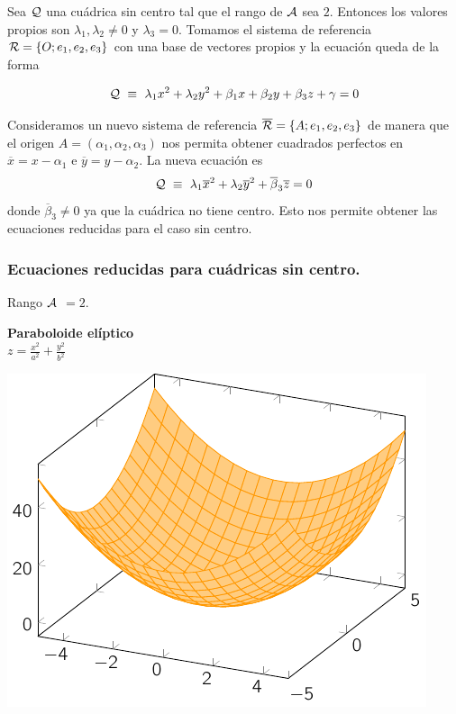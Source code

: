 \documentclass[11pt, a4paper]{article}
\newif\IfInSansMode
\theoremstyle{theorem-style}
\theoremstyle{definition-style}
\theoremstyle{remark-style}
\theoremstyle{example-style}
\begin{document}
Sea $\cal Q$ una cu\'adrica sin centro tal que el rango de $\cal A$ sea $2$. Entonces los valores propios son 
$\lambda_1,\lambda_2 \neq 0$ y $\lambda_3=0$. Tomamos el sistema de referencia ${\cal R} = \{O; e_1,e_2,e_3\}$ con una base de vectores propios y la ecuaci\'on queda de la forma 

\vspace{.3cm}

\[
{\cal Q} \, \, \equiv \, \, \lambda_1 x^2 + \lambda_2 y^2 + \beta_1 x + \beta_2 y + \beta_3 z + \gamma = 0
\]  

\vspace{.2cm}

Consideramos un nuevo sistema de referencia $\overline{{\cal R}} = \{A;e_1,e_2,e_3\}$ de manera que el origen 
$A=(\alpha_1,\alpha_2,\alpha_3)$ nos permita obtener cuadrados perfectos en $\overline{x}=x-\alpha_1$ e 
$\overline{y}=y-\alpha_2$. La nueva ecuaci\'on es
\[
{\cal Q} \, \, \equiv \, \, \lambda_1 \overline{x}^2 + \lambda_2 \overline{y}^2 + 
\overline{\beta}_3 \overline{z} = 0
\]
donde $\overline{\beta}_3\neq 0$ ya que la cu\'adrica no tiene centro. Esto nos permite obtener las ecuaciones reducidas para el caso sin centro.


\subsubsection{Ecuaciones reducidas para cuádricas sin centro.}

Rango $\cal A$ $=2$.

\begin{minipage}[c]{0.45\textwidth}
  {\bf Paraboloide elíptico}\vspace{1em}\\
  $\displaystyle z = \frac{x^2}{a^2} + \frac{y^2}{b^2}$
\end{minipage}\hfill
\begin{minipage}[]{0.45\textwidth}
\includegraphics{./img/peli.pdf}
\end{minipage}
\end{document}
